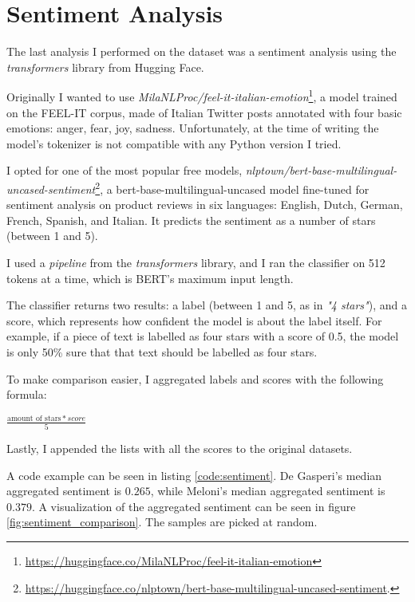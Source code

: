 \section{Sentiment Analysis}

The last analysis I performed on the dataset was a sentiment analysis using the \textit{transformers} library from Hugging Face.

Originally I wanted to use \textit{MilaNLProc/feel-it-italian-emotion}\footnote{\url{https://huggingface.co/MilaNLProc/feel-it-italian-emotion}}, a model trained on the FEEL-IT corpus, made of Italian Twitter posts annotated with four basic emotions: anger, fear, joy, sadness.
Unfortunately, at the time of writing the model's tokenizer is not compatible with any Python version I tried. 

I opted for one of the most popular free models, \textit{nlptown/bert-base-multilingual-uncased-sentiment}\footnote{\url{https://huggingface.co/nlptown/bert-base-multilingual-uncased-sentiment}.}, a bert-base-multilingual-uncased model fine-tuned for sentiment analysis on product reviews in six languages: English, Dutch, German, French, Spanish, and Italian. It predicts the sentiment as a number of stars (between 1 and 5).

I used a \textit{pipeline} from the \textit{transformers} library, and I ran the classifier on 512 tokens at a time, which is BERT's maximum input length. 

The classifier returns two results: a label (between 1 and 5, as in \textit{"4 stars"}), and a score, which represents how confident the model is about the label itself. For example, if a piece of text is labelled as four stars with a score of 0.5, the model is only 50\% sure that that text should be labelled as four stars.

To make comparison easier, I aggregated labels and scores with the following formula: 

\begin{center}
    $\frac{\text{amount of stars}*score}{5}$

\end{center}

Lastly, I appended the lists with all the scores to the original datasets.

A code example can be seen in listing \ref{code:sentiment}. De Gasperi's median aggregated sentiment is $0.265$, while Meloni's median aggregated sentiment is $0.379$. A visualization of the aggregated sentiment can be seen in figure \ref{fig:sentiment_comparison}. The samples are picked at random.



